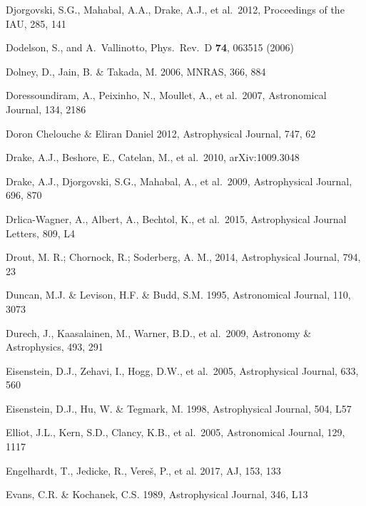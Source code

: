 \documentclass[twocolumn]{aastex61}
\begin{document}
\begin{thebibliography}{}
 Djorgovski, S.G., Mahabal, A.A., Drake, A.J., et al.~2012, Proceedings of the IAU, 285, 141

 Dodelson, S., and A.~Vallinotto, Phys.\ Rev.\ D {\bf 74}, 063515 (2006)

 Dolney, D., Jain, B. \& Takada, M. 2006, MNRAS, 366, 884

 Doressoundiram, A., Peixinho, N., Moullet, A., et al.~2007, Astronomical Journal, 134, 2186

 Doron Chelouche \& Eliran Daniel 2012, Astrophysical Journal, 747, 62

 Drake, A.J., Beshore, E., Catelan, M., et al.~2010, arXiv:1009.3048

 Drake, A.J., Djorgovski, S.G., Mahabal, A., et al.~2009, Astrophysical Journal, 696, 870

 Drlica-Wagner, A., Albert, A., Bechtol, K., et al.\ 2015, Astrophysical Journal Letters, 809, L4

 Drout, M. R.; Chornock, R.; Soderberg, A. M., 2014, Astrophysical Journal,  794, 23

 Duncan, M.J. \& Levison, H.F. \& Budd, S.M. 1995, Astronomical Journal, 110, 3073

 Durech, J., Kaasalainen, M., Warner, B.D., et al.~2009, Astronomy \& Astrophysics, 493, 291

 Eisenstein, D.J., Zehavi, I., Hogg, D.W., et al.~2005, Astrophysical Journal, 633, 560

 Eisenstein, D.J., Hu, W. \& Tegmark, M. 1998, Astrophysical Journal, 504, L57

 Elliot, J.L., Kern, S.D., Clancy, K.B., et al.~2005,  Astronomical Journal, 129, 1117

 Engelhardt, T., Jedicke, R., Vere\v{s}, P., et al. 2017, AJ, 153, 133

 Evans, C.R. \& Kochanek, C.S. 1989, Astrophysical Journal, 346, L13


\end{thebibliography}
\end{document}
